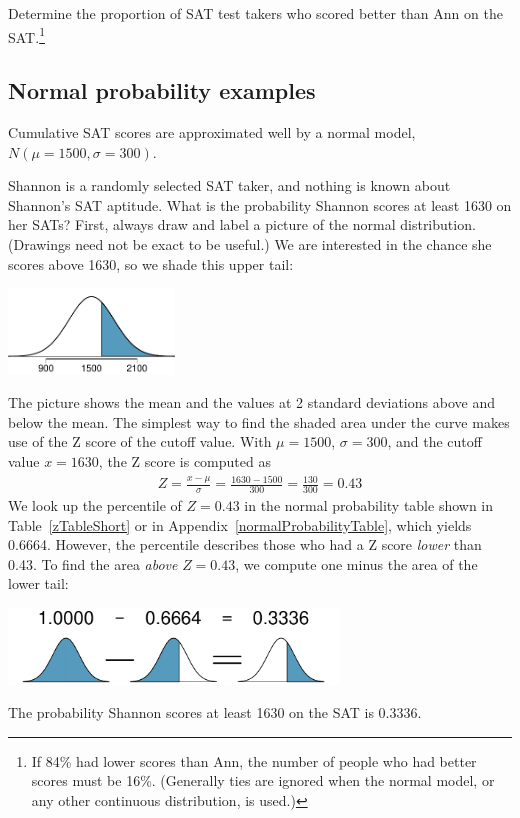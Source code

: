 \begin{exercise}
Determine the proportion of SAT test takers who scored better than Ann on the SAT.\footnote{If 84\% had lower scores than Ann, the number of people who had better scores must be 16\%. (Generally ties are ignored when the normal model, or any other continuous distribution, is used.)}
\end{exercise}

\textPE{\pagebreak}


\subsection{Normal probability examples}

Cumulative SAT scores are approximated well by a normal model, $N(\mu=1500, \sigma=300)$.

\begin{example}{Shannon is a randomly selected SAT taker, and nothing is known about Shannon's SAT aptitude. What is the probability Shannon scores at least 1630 on her SATs?}\label{satAbove1630Exam}
First, always draw and label a picture of the normal distribution. (Drawings need not be exact to be useful.) We are interested in the chance she scores above 1630, so we shade this upper tail:
\begin{center}
\includegraphics[height=0.9in]{02/figures/satAbove1630/satAbove1630}
\end{center}
The picture shows the mean and the values at 2 standard deviations above and below the mean. The simplest way to find the shaded area under the curve makes use of the Z score of the cutoff value. With $\mu=1500$, $\sigma=300$, and the cutoff value $x=1630$, the Z score is computed as
\begin{eqnarray*}
Z = \frac{x - \mu}{\sigma} = \frac{1630 - 1500}{300} = \frac{130}{300} = 0.43
\end{eqnarray*}
We look up the percentile of $Z=0.43$ in the normal probability table shown in Table~\ref{zTableShort} or in Appendix~\vref{normalProbabilityTable}, which yields 0.6664. However, the percentile describes those who had a Z score \emph{lower} than 0.43. To find the area \emph{above} $Z=0.43$, we compute one minus the area of the lower tail:
\begin{center}
\includegraphics[height=0.8in]{02/figures/subtractingArea/subtractingArea}
\end{center}
The probability Shannon scores at least 1630 on the SAT is 0.3336.
\end{example}

